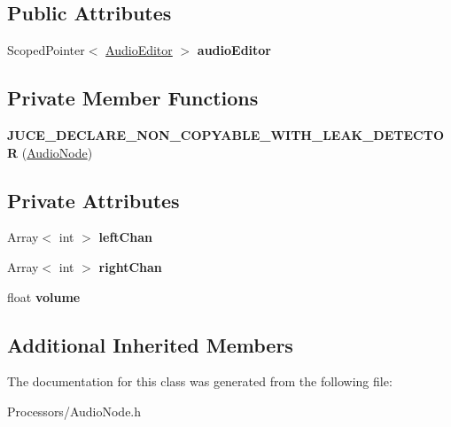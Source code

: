 \subsection*{Public Attributes}
\begin{DoxyCompactItemize}
\item 
\hypertarget{classAudioNode_a23fc8aba3a18b99825bed4836eb6f647}{Scoped\-Pointer$<$ \hyperlink{classAudioEditor}{Audio\-Editor} $>$ {\bfseries audio\-Editor}}\label{classAudioNode_a23fc8aba3a18b99825bed4836eb6f647}

\end{DoxyCompactItemize}
\subsection*{Private Member Functions}
\begin{DoxyCompactItemize}
\item 
\hypertarget{classAudioNode_af61664bac9bbf287c15f909b70fadc5e}{{\bfseries J\-U\-C\-E\-\_\-\-D\-E\-C\-L\-A\-R\-E\-\_\-\-N\-O\-N\-\_\-\-C\-O\-P\-Y\-A\-B\-L\-E\-\_\-\-W\-I\-T\-H\-\_\-\-L\-E\-A\-K\-\_\-\-D\-E\-T\-E\-C\-T\-O\-R} (\hyperlink{classAudioNode}{Audio\-Node})}\label{classAudioNode_af61664bac9bbf287c15f909b70fadc5e}

\end{DoxyCompactItemize}
\subsection*{Private Attributes}
\begin{DoxyCompactItemize}
\item 
\hypertarget{classAudioNode_a751bace950ee0682227d0b488e8fd71b}{Array$<$ int $>$ {\bfseries left\-Chan}}\label{classAudioNode_a751bace950ee0682227d0b488e8fd71b}

\item 
\hypertarget{classAudioNode_a8e0286ba3263d2a4ad84c8c51cab98f6}{Array$<$ int $>$ {\bfseries right\-Chan}}\label{classAudioNode_a8e0286ba3263d2a4ad84c8c51cab98f6}

\item 
\hypertarget{classAudioNode_ab269ffd3dc0f501984db1be343f9f70d}{float {\bfseries volume}}\label{classAudioNode_ab269ffd3dc0f501984db1be343f9f70d}

\end{DoxyCompactItemize}
\subsection*{Additional Inherited Members}


The documentation for this class was generated from the following file\-:\begin{DoxyCompactItemize}
\item 
Processors/Audio\-Node.\-h\end{DoxyCompactItemize}
